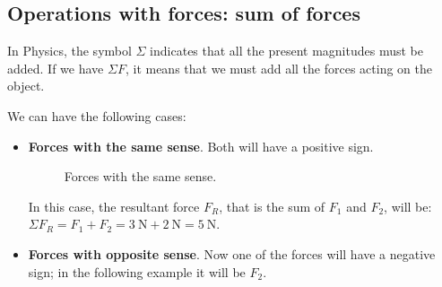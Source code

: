 \subsection{Operations with forces: sum of forces}

In Physics, the symbol \( \Sigma \) indicates that all the present magnitudes must be added.
If we have \( \Sigma F \), it means that we must add all the forces acting on the object.

We can have the following cases:

\begin{itemize}
    \item \textbf{Forces with the same sense}.
    Both will have a positive sign.
    \begin{figure}[H]
        \centering
        \caption{Forces with the same sense.}
    \end{figure}
    In this case, the resultant force \( F_R \), that is the sum of \( F_1 \) and \( F_2 \), will be:
    \( \Sigma F_R = F_1 + F_2 = \qty{3}{\newton} + \qty{2}{\newton} = \qty{5}{\newton} \).

    \item \textbf{Forces with opposite sense}.
    Now one of the forces will have a negative sign; in the following example it will be \( F_2 \).
    \begin{figure}[H]
        \centering
\end{figure}
\end{itemize}
